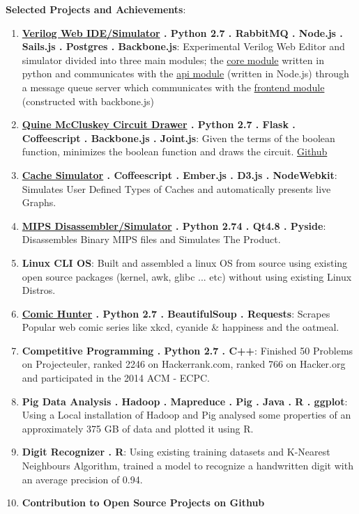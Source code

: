 \documentclass[24pt]{article}
\begin{document}
{\large \textbf{Selected Projects and Achievements}}:
\begin{enumerate}
	\item \textbf{\href{http://ovide.ayad.me}{Verilog Web IDE/Simulator} . Python 2.7 . RabbitMQ . Node.js . Sails.js . Postgres . Backbone.js}: Experimental Verilog Web Editor and simulator divided into three main modules; the \href{http://github.com/omarayad1/ovide-core}{core module} written in python and communicates with the \href{http://github.com/omarayad1/ovide-api}{api module} (written in Node.js) through a message queue server which communicates with the \href{http://github.com/omarayad1/ovide-web}{frontend module} (constructed with backbone.js)
	\item \textbf{\href{http://mcclusky.ayad.me}{Quine McCluskey Circuit Drawer} . Python 2.7 . Flask . Coffeescript . Backbone.js . Joint.js}: Given the terms of the boolean function, minimizes the boolean function and draws the circuit. \href{http://github.com/omarayad1/The-McCluskenator}{Github}
	\item \textbf{\href{http://github.com/omarayad1/Yo-Cache}{Cache Simulator} . Coffeescript . Ember.js . D3.js . NodeWebkit}: Simulates User Defined Types of Caches and automatically presents live Graphs.
	\item \textbf{\href{http://github.com/omarayad1/Yo-MIPS}{MIPS Disassembler/Simulator} . Python 2.74 . Qt4.8 . Pyside}: Disassembles Binary MIPS files and Simulates The Product.
	\item \textbf{Linux CLI OS}: Built and assembled a linux OS from source using existing open source packages (kernel, awk, glibc ... etc) without using existing Linux Distros.
	\item \textbf{\href{http://github.com/omarayad1/Comic-Hunter}{Comic Hunter} . Python 2.7 . BeautifulSoup . Requests}: Scrapes Popular web comic series like xkcd, cyanide \& happiness and the oatmeal.
	\item \textbf{Competitive Programming . Python 2.7 . C++}: Finished 50 Problems on Projecteuler, ranked 2246 on Hackerrank.com, ranked 766 on Hacker.org and participated in the 2014 ACM - ECPC.
	\item \textbf{Pig Data Analysis . Hadoop . Mapreduce . Pig . Java . R . ggplot}: Using a Local installation of Hadoop and Pig analysed some properties of an approximately 375 GB of data and plotted it using R.
	\item \textbf{Digit Recognizer . R}: Using existing training datasets and K-Nearest Neighbours Algorithm, trained a model to recognize a handwritten digit with an average precision of 0.94.
	\item \textbf{Contribution to Open Source Projects on Github}
\end{enumerate}
\end{document}
